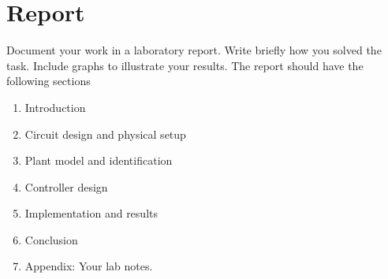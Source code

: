 \documentclass[a4paper]{scrartcl}
\begin{document}
\section*{Report}
\label{sec-6}
Document your work in a laboratory report. Write briefly how you solved the task. Include graphs to illustrate your results. The report should have the following sections
\begin{enumerate}
\item Introduction
\item Circuit design and physical setup
\item Plant model and identification
\item Controller design
\item Implementation and results
\item Conclusion
\item Appendix: Your lab notes.
\end{enumerate}
\end{document}
